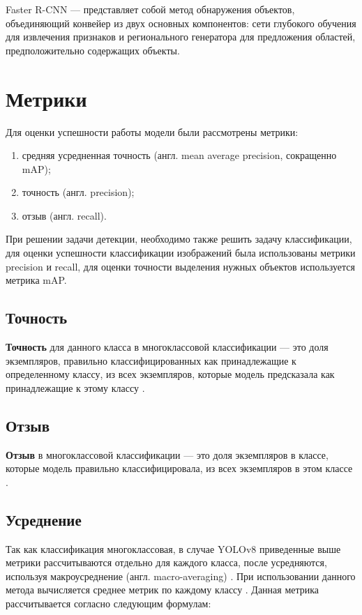 Faster R-CNN --- представляет собой метод обнаружения объектов, объединяющий конвейер из двух основных компонентов: сети глубокого обучения для извлечения признаков и регионального генератора для предложения областей, предположительно содержащих объекты.

\section{Метрики}
Для оценки успешности работы модели были рассмотрены метрики:
\begin{enumerate}
	\item средняя усредненная точность (англ. mean average precision, сокращенно mAP);
	\item точность (англ. precision);
	\item отзыв (англ. recall).
\end{enumerate}

При решении задачи детекции, необходимо  также решить задачу классификации, для оценки успешности классификации изображений была использованы метрики precision  
и recall, для оценки точности выделения нужных объектов используется метрика mAP. 

\subsection{Точность}
\textbf{Точность} для данного класса в многоклассовой классификации --- это доля экземпляров, правильно классифицированных как принадлежащие к определенному классу, из всех экземпляров, которые модель предсказала как принадлежащие к этому классу \cite{class_metrics}.

\subsection{Отзыв}
\textbf{Отзыв} в многоклассовой классификации --- это доля экземпляров в классе, которые модель правильно классифицировала, из всех экземпляров в этом классе \cite{class_metrics}.

\subsection{Усреднение}
Так как классификация многоклассовая, в случае YOLOv8 приведенные выше метрики рассчитываются отдельно для каждого класса, после усредняются, используя макроусреднение (англ. macro-averaging) \cite{YOLOv8}. При использовании данного метода вычисляется среднее метрик по каждому классу \cite{class_metrics}. Данная метрика рассчитывается согласно следующим формулам:

